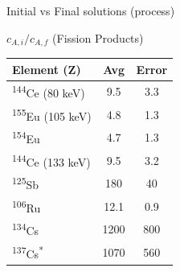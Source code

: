 \documentclass{beamer}
\newcommand{\tss}{\textsuperscript}
\begin{document}
\begin{frame}{\small Initial vs Final solutions (process)}
  \vspace{-0.6cm}
  \begin{block}{$c_{A,i}/c_{A,f}$ (Fission Products)}
    \begin{center}
      \vskip -0.2cm
  {\fontsize{7}{11.2}\selectfont
  \begin{tabular}{l  c  c }\toprule
   Element (Z)  & Avg & Error \\ \midrule 
   \tss{144}Ce (80 keV) & 9.5 & 3.3  \\
   \tss{155}Eu (105 keV) & 4.8 & 1.3   \\
   \tss{154}Eu & 4.7  & 1.3  \\
   \tss{144}Ce (133 keV) & 9.5 & 3.2  \\
   \tss{125}Sb & 180   & 40   \\
   \tss{106}Ru & 12.1   & 0.9   \\
   \tss{134}Cs & 1200  & 800   \\
   \tss{137}Cs\tss{*} & 1070 & 560\\ \bottomrule
  \end{tabular}
  }
  \end{center}
  \end{block}
\end{frame}

\end{document}
